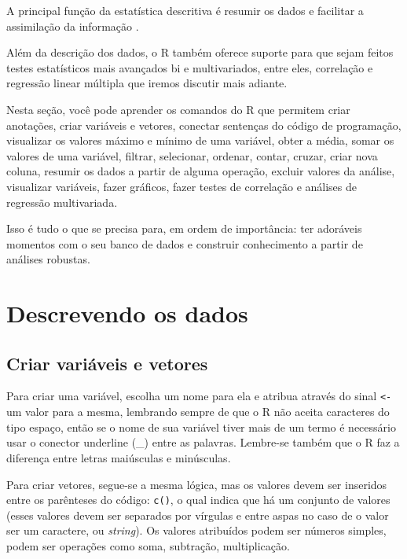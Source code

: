 \documentclass[
  10pt,
  brazil,
  a4paper,
  twoside, notitlepage, openright]{book}
\begin{document}
A principal função da estatística descritiva é resumir os dados e facilitar a assimilação da informação \citep{agresti_metodos_2012}.

Além da descrição dos dados, o R também oferece suporte para que sejam feitos testes estatísticos mais avançados bi e multivariados, entre eles, correlação e regressão linear múltipla que iremos discutir mais adiante.

Nesta seção, você pode aprender os comandos do R que permitem criar anotações, criar variáveis e vetores, conectar sentenças do código de programação, visualizar os valores máximo e mínimo de uma variável, obter a média, somar os valores de uma variável, filtrar, selecionar, ordenar, contar, cruzar, criar nova coluna, resumir os dados a partir de alguma operação, excluir valores da análise, visualizar variáveis, fazer gráficos, fazer testes de correlação e análises de regressão multivariada.

Isso é tudo o que se precisa para, em ordem de importância: ter adoráveis momentos com o seu banco de dados e construir conhecimento a partir de análises robustas.

\hypertarget{descrevendo-os-dados}{%
\section{Descrevendo os dados}\label{descrevendo-os-dados}}

\hypertarget{criar-variuxe1veis-e-vetores}{%
\subsection{Criar variáveis e vetores}\label{criar-variuxe1veis-e-vetores}}

Para criar uma variável, escolha um nome para ela e atribua através do sinal \texttt{\textless{}-} um valor para a mesma, lembrando sempre de que o R não aceita caracteres do tipo espaço, então se o nome de sua variável tiver mais de um termo é necessário usar o conector underline (\_) entre as palavras. Lembre-se também que o R faz a diferença entre letras maiúsculas e minúsculas.

Para criar vetores, segue-se a mesma lógica, mas os valores devem ser inseridos entre os parênteses do código: \texttt{c()}, o qual indica que há um conjunto de valores (esses valores devem ser separados por vírgulas e entre aspas no caso de o valor ser um caractere, ou \emph{string}). Os valores atribuídos podem ser números simples, podem ser operações como soma, subtração, multiplicação.
\end{document}
